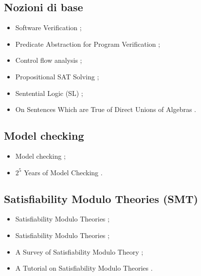 \subsection*{Nozioni di base}
\begin{itemize}

\item Software Verification \cite{kroening2021softver};

\item Predicate Abstraction for Program Verification \cite{jhala2018predver};

\item Control flow analysis \cite{allen1970cfa};

\item Propositional SAT Solving \cite{marquessilva2018sat};

\item Sentential Logic (SL) \cite{polkowski2023sl};

\item On Sentences Which are True of Direct Unions of Algebras \cite{horn1951clause}.

\end{itemize}

\subsection*{Model checking}
\begin{itemize}

\item Model checking \cite{clarke1997modelcheck};

\item $2^5$ Years of Model Checking \cite{clarke2014modelcheck}.

\end{itemize}

\subsection*{Satisfiability Modulo Theories (SMT)}
\begin{itemize}

\item Satisfiability Modulo Theories \cite{barrett2021smt};

\item Satisfiability Modulo Theories \cite{barrett2018smt};

\item A Survey of Satisfiability Modulo Theory \cite{monniaux2016smt};

\item A Tutorial on Satisfiability Modulo Theories \cite{demoura2007smt}.

\end{itemize}

